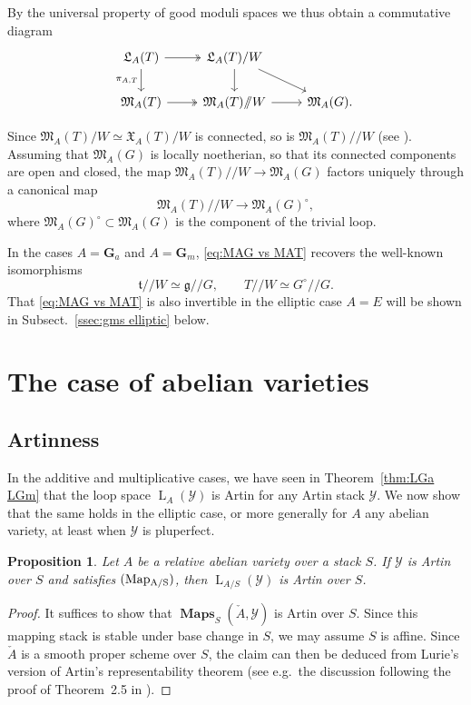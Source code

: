 \documentclass[12pt, oneside]{amsart}
\numberwithin{equation}{section}
\newtheorem{proposition}[subsubsection]{Proposition}
\theoremstyle{remark}
\theoremstyle{plain}
\DeclareMathOperator{\MAP}{\mathbf{Maps}}
\newcommand{\frM}{\mathfrak{M}}
\newcommand{\frL}{\mathfrak{L}}
\newcommand{\frX}{\mathfrak{X}}
\newcommand{\Loop}{\operatorname{L}}
\newcommand{\YY}{\mathcal{Y}}
\newcommand{\modmod}{/\!\!/}
\newcommand{\GGa}{\mathbf{G}_{a}}
\newcommand{\GGm}{\mathbf{G}_{m}}
\begin{document}
By the universal property of good moduli spaces we thus obtain a commutative diagram
\[\begin{tikzcd}
  \frL_A(T) \ar[twoheadrightarrow]{r}\ar[swap]{d}{\pi_{A,T}}
  & \frL_A(T)/W \ar{d}\ar{rd}
  &
  \\
  \frM_A(T) \ar[twoheadrightarrow]{r}
  & \frM_A(T)\modmod W \ar{r}
  & \frM_A(G).
\end{tikzcd}\]

Since $\frM_A(T)/W \simeq \frX_A(T)/W$ is connected, so is $\frM_A(T)\modmod W$ (see \cite[Thm.~4.16(viii)]{Alper}).
Assuming that $\frM_A(G)$ is locally noetherian, so that its connected components are open and closed, the map $\frM_A(T)\modmod W \to \frM_A(G)$ factors uniquely through a canonical map
\begin{equation}\label{eq:MAG vs MAT}
	\frM_A(T)\modmod W \longrightarrow \frM_A(G)^\circ,
\end{equation}
where $\frM_A(G)^\circ \subset \frM_A(G)$ is the component of the trivial loop.

In the cases $A=\GGa$ and $A=\GGm$, \eqref{eq:MAG vs MAT} recovers the well-known isomorphisms
\[
  \mathfrak{t} \modmod W \simeq \mathfrak{g} \modmod G, \qquad
  T \modmod W \simeq G^\circ \modmod G.
\]
That \eqref{eq:MAG vs MAT} is also invertible in the elliptic case $A=E$ will be shown in Subsect.~\ref{ssec:gms elliptic} below.

\section{The case of abelian varieties}\label{sec:abvar}

\subsection{Artinness}\label{ssec:abvar Artin}

In the additive and multiplicative cases, we have seen in Theorem~\ref{thm:LGa LGm} that the loop space $\Loop_A(\YY)$ is Artin for any Artin stack $\YY$.
We now show that the same holds in the elliptic case, or more generally for $A$ any abelian variety, at least when $\YY$ is pluperfect.

\begin{proposition}\label{prop:open in map implies Artin}
  Let $A$ be a relative abelian variety over a stack $S$.
  If $\YY$ is Artin over $S$ and satisfies $(\textup{Map}\textsubscript{A/S})$, then $\Loop_{A/S}(\YY)$ is Artin over $S$.
\end{proposition}
\begin{proof}
  It suffices to show that $\MAP_S(\check{A}, \YY)$ is Artin over $S$.
  Since this mapping stack is stable under base change in $S$, we may assume $S$ is affine.
  Since $\check{A}$ is a smooth proper scheme over $S$, the claim can then be deduced from Lurie's version of Artin's representability theorem (see e.g.\ the discussion following the proof of Theorem~2.5 in \cite{PTVV}).
\end{proof}
\end{document}
